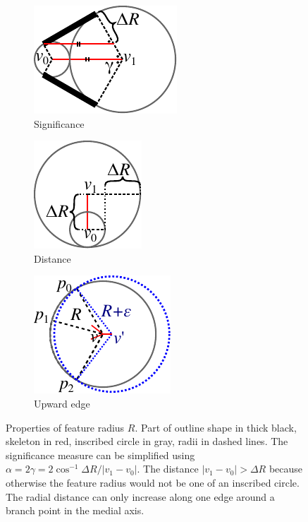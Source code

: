 \begin{figure} \centering
\newlength{\significancePropertiesHeight}
\setlength{\significancePropertiesHeight}{.25\columnwidth}
\begin{subfigure}{0.35\columnwidth} \centering
\includegraphics[height=\significancePropertiesHeight]{sources/method/distance_based_angles.pdf}
\caption{Significance}
\label{distance_based_angles}
\end{subfigure}
\begin{subfigure}{0.3\columnwidth} \centering
\includegraphics[height=\significancePropertiesHeight]{sources/method/distance_ratio_limit.pdf}
\caption{Distance}
\label{distance_ratio_limit}
\end{subfigure}
\begin{subfigure}{0.3\columnwidth} \centering
\includegraphics[height=\significancePropertiesHeight]{sources/method/branch_upward_edge_property.pdf}
\caption{Upward edge}
\label{branch_upward_edge_property}
\end{subfigure}
\caption{
Properties of feature radius $R$.
Part of outline shape in thick black,
skeleton in red,
inscribed circle in gray,
radii in dashed lines.
 The significance measure can be simplified using $\alpha = 2 \gamma = 2 \cos^{-1} \Delta R / |v_1 - v_0|$.
 The distance $|v_1 - v_0| > \Delta R$ because otherwise the feature radius would not be one of an inscribed circle.
 The radial distance can only increase along one edge around a branch point in the medial axis.
}
\end{figure}


